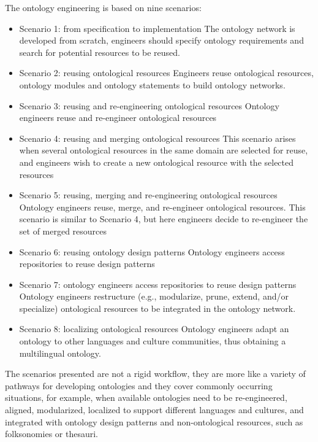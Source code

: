 The ontology engineering is based on nine scenarios:
\begin{itemize}
    \item Scenario 1: from specification to implementation The ontology network is developed from scratch, engineers should specify ontology requirements and search for potential resources to be reused. 

    \item Scenario 2: reusing ontological resources Engineers reuse ontological resources, ontology modules and ontology statements to build ontology networks. 

    \item Scenario 3: reusing and re-engineering ontological resources Ontology engineers reuse and re-engineer ontological resources

    \item Scenario 4: reusing and merging ontological resources This scenario arises when several ontological resources in the same domain are selected for reuse, and engineers wish to create a new ontological resource with the selected resources

    \item Scenario 5: reusing, merging and re-engineering ontological resources Ontology engineers reuse, merge, and re-engineer ontological resources. 
    This scenario is similar to Scenario 4, but here engineers decide to re-engineer the set of merged resources

    \item  Scenario 6: reusing ontology design patterns Ontology engineers access repositories to reuse design patterns

    \item Scenario 7: ontology engineers access repositories to reuse design patterns Ontology engineers restructure (e.g., modularize, prune, extend, and/or specialize) ontological resources to be  integrated in the ontology network. 

    \item Scenario 8: localizing ontological resources Ontology engineers adapt an ontology to other languages and culture communities, thus obtaining a multilingual ontology.

\end{itemize}
The scenarios presented are not a rigid workflow, they are more like a variety of pathways for developing ontologies and they cover commonly occurring situations, for example, when available ontologies need to be re-engineered, aligned, modularized, localized to support different languages and cultures, and integrated with ontology design patterns and non-ontological resources, such as folksonomies or thesauri\cite{suarez2011neon}.

